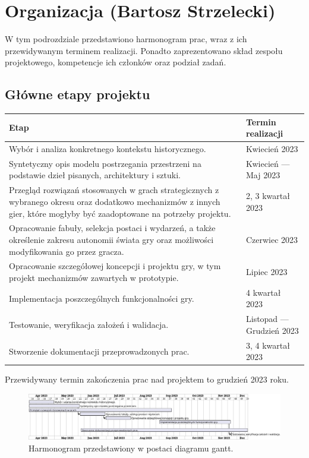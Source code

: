 \section{Organizacja (Bartosz Strzelecki)}\label{s:org}
W tym podrozdziale przedstawiono harmonogram prac, wraz z ich przewidywanym terminem realizacji.
Ponadto zaprezentowano skład zespołu projektowego, kompetencje ich członków oraz podział zadań.
\subsection{Główne etapy projektu}
\begin{center}
  \begin{tabular}{| m{30em} | m{12em}|} 
  \hline
  Etap & Termin realizacji \\
  \hline\hline
  Wybór i analiza konkretnego kontekstu historycznego. & Kwiecień 2023 \\
  \hline
  Syntetyczny opis modelu postrzegania przestrzeni na podstawie dzieł pisanych, architektury i sztuki. & Kwiecień — Maj 2023 \\
  \hline
  Przegląd rozwiązań stosowanych w grach strategicznych z wybranego okresu oraz dodatkowo mechanizmów z innych gier, które mogłyby być zaadoptowane na potrzeby projektu. & 2, 3 kwartał 2023 \\
  \hline
  Opracowanie fabuły, selekcja postaci i wydarzeń, a także określenie zakresu autonomii świata gry oraz możliwości modyfikowania go przez gracza. & Czerwiec 2023 \\
  \hline
  Opracowanie szczegółowej koncepcji i projektu gry, w tym projekt mechanizmów zawartych w prototypie. & Lipiec 2023 \\
  \hline
  Implementacja poszczególnych funkcjonalności gry. & 4 kwartał 2023 \\ 
  \hline
  Testowanie, weryfikacja założeń i walidacja. & Listopad — Grudzień 2023 \\
  \hline
  Stworzenie dokumentacji przeprowadzonych prac. & 3, 4 kwartał 2023 \\
  \hline
\end{tabular}
\end{center}
Przewidywany termin zakończenia prac nad projektem to grudzień 2023 roku.
\begin{figure}[htbp]
    \centering
    \includegraphics[width=1\textwidth]{uml/Harmonogram}
    \caption{Harmonogram przedstawiony w postaci diagramu gantt.}
\end{figure}
\break
